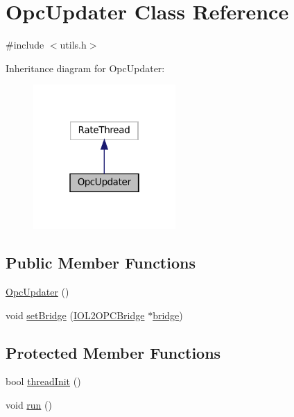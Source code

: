 \hypertarget{classOpcUpdater}{}\section{Opc\+Updater Class Reference}
\label{classOpcUpdater}


{\ttfamily \#include $<$utils.\+h$>$}



Inheritance diagram for Opc\+Updater\+:
\nopagebreak
\begin{figure}[H]
\begin{center}
\leavevmode
\includegraphics[width=154pt]{classOpcUpdater__inherit__graph}
\end{center}
\end{figure}
\subsection*{Public Member Functions}
\begin{DoxyCompactItemize}
\item 
\hyperlink{classOpcUpdater_a80410373d810aa38cfcecc71e0442605}{Opc\+Updater} ()
\item 
void \hyperlink{classOpcUpdater_ac1143b612eae3f2c8711343a5836c7f1}{set\+Bridge} (\hyperlink{group__iol2opc_classIOL2OPCBridge}{I\+O\+L2\+O\+P\+C\+Bridge} $\ast$\hyperlink{classOpcUpdater_a2a19d340c7173501cc60c2a154d80946}{bridge})
\end{DoxyCompactItemize}
\subsection*{Protected Member Functions}
\begin{DoxyCompactItemize}
\item 
bool \hyperlink{classOpcUpdater_a4e5af469e9f8ac81d2d1e773afc04c1e}{thread\+Init} ()
\item 
void \hyperlink{classOpcUpdater_ad9271871f917b0377900dc76a577773d}{run} ()
\end{DoxyCompactItemize}
